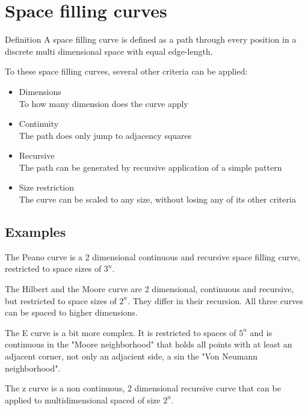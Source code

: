 \section{Space filling curves}
\label{sec:curves}
\par{Definition}
A space filling curve is defined as a path through every position in a discrete multi dimensional space with equal edge-length.%

To these space filling curves, several other criteria can be applied:
\begin{itemize}%
   \item Dimensions\\
      To how many dimension does the curve apply
   \item Continuity\\
      The path does only jump to adjacency squares
   \item Recursive\\
      The path can be generated by recursive application of a simple pattern
   \item Size restriction\\
      The curve can be scaled to any size, without losing any of its other criteria
\end{itemize}%

\subsection{Examples}
\label{subsec:curve_examples}

The Peano curve is a 2 dimensional continuous and recursive space filling curve, restricted to space sizes of $3^{n}$.

The Hilbert and the Moore curve are 2 dimensional, continuous and recursive, but restricted to space sizes of $2^{n}$. They differ in their recursion. All three curves can be spaced to higher dimensions.
 
The E curve is a bit more complex. It is restricted to spaces of $5^{n}$ and is continuous in the "Moore neighborhood" that holds all points with at least an adjacent corner, not only an adjacient side, a sin the "Von Neumann neighborhood".

The z curve is a non continuous, 2 dimensional recursive curve that can be applied to multidimensional spaced of size $2^{n}$.

